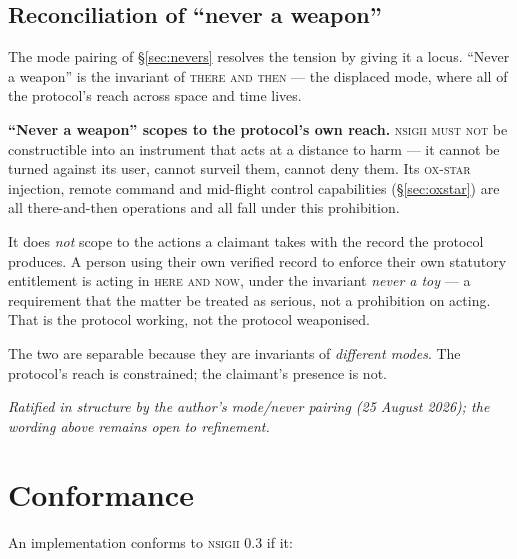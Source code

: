\documentclass[11pt,a4paper]{article}
\newcommand{\MUSTNOT}{\textsc{must not}}
\newcommand{\NSIGII}{\textsc{nsigii}}
\begin{document}
\subsection{Reconciliation of ``never a weapon''}
\label{sec:reconcile}

The mode pairing of \S\ref{sec:nevers} resolves the tension by giving it a
locus. ``Never a weapon'' is the invariant of \textsc{there and then} --- the
displaced mode, where all of the protocol's reach across space and time lives.

\begin{ruleblock}
\textbf{``Never a weapon'' scopes to the protocol's own reach.} \NSIGII{}
\MUSTNOT{} be constructible into an instrument that acts at a distance to harm
--- it cannot be turned against its user, cannot surveil them, cannot deny them.
Its \textsc{ox-star} injection, remote command and mid-flight control
capabilities (\S\ref{sec:oxstar}) are all there-and-then operations and all fall
under this prohibition.

It does \emph{not} scope to the actions a claimant takes with the record the
protocol produces. A person using their own verified record to enforce their own
statutory entitlement is acting in \textsc{here and now}, under the invariant
\emph{never a toy} --- a requirement that the matter be treated as serious, not
a prohibition on acting. That is the protocol working, not the protocol
weaponised.
\end{ruleblock}

The two are separable because they are invariants of \emph{different modes}. The
protocol's reach is constrained; the claimant's presence is not.

\emph{Ratified in structure by the author's mode/never pairing (25 August 2026);
the wording above remains open to refinement.}

\section{Conformance}

An implementation conforms to \NSIGII{} 0.3 if it:
\end{document}
